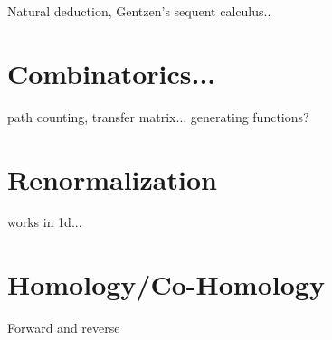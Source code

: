 \documentclass[12pt]{article}
\begin{document}
Natural deduction, Gentzen's sequent calculus..

\section{Combinatorics...}

path counting, transfer matrix...
generating functions?

\section{Renormalization}

works in 1d...

\section{Homology/Co-Homology}

Forward and reverse


{}

\end{document}
